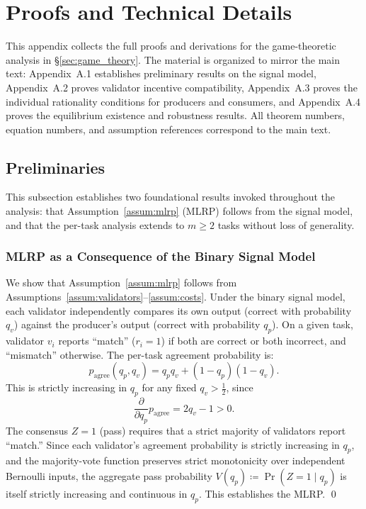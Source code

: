 \appendix

\section{Proofs and Technical Details}
\label{sec:appendix_proofs}

This appendix collects the full proofs and derivations for the game-theoretic analysis in \S\ref{sec:game_theory}. The material is organized to mirror the main text: Appendix~A.1 establishes preliminary results on the signal model, Appendix~A.2 proves validator incentive compatibility, Appendix~A.3 proves the individual rationality conditions for producers and consumers, and Appendix~A.4 proves the equilibrium existence and robustness results. All theorem numbers, equation numbers, and assumption references correspond to the main text.


\subsection{Preliminaries}
\label{app:preliminaries}

This subsection establishes two foundational results invoked throughout the analysis: that Assumption~\ref{assum:mlrp} (MLRP) follows from the signal model, and that the per-task analysis extends to $m \geq 2$ tasks without loss of generality.

\subsubsection{MLRP as a Consequence of the Binary Signal Model}
\label{app:mlrp_derived}

We show that Assumption~\ref{assum:mlrp} follows from Assumptions~\ref{assum:validators}--\ref{assum:costs}. Under the binary signal model, each validator independently compares its own output (correct with probability $q_v$) against the producer's output (correct with probability $q_p$). On a given task, validator $v_i$ reports ``match'' ($r_i = 1$) if both are correct or both incorrect, and ``mismatch'' otherwise. The per-task agreement probability is:
\[
p_{\text{agree}}(q_p, q_v) = q_p q_v + (1 - q_p)(1 - q_v).
\]
This is strictly increasing in $q_p$ for any fixed $q_v > \frac{1}{2}$, since
\[
\frac{\partial}{\partial q_p} p_{\text{agree}} = 2q_v - 1 > 0.
\]
The consensus $Z = 1$ (pass) requires that a strict majority of validators report ``match.'' Since each validator's agreement probability is strictly increasing in $q_p$, and the majority-vote function preserves strict monotonicity over independent Bernoulli inputs, the aggregate pass probability $V(q_p) \coloneqq \Pr(Z = 1 \mid q_p)$ is itself strictly increasing and continuous in $q_p$. This establishes the MLRP. \qed


